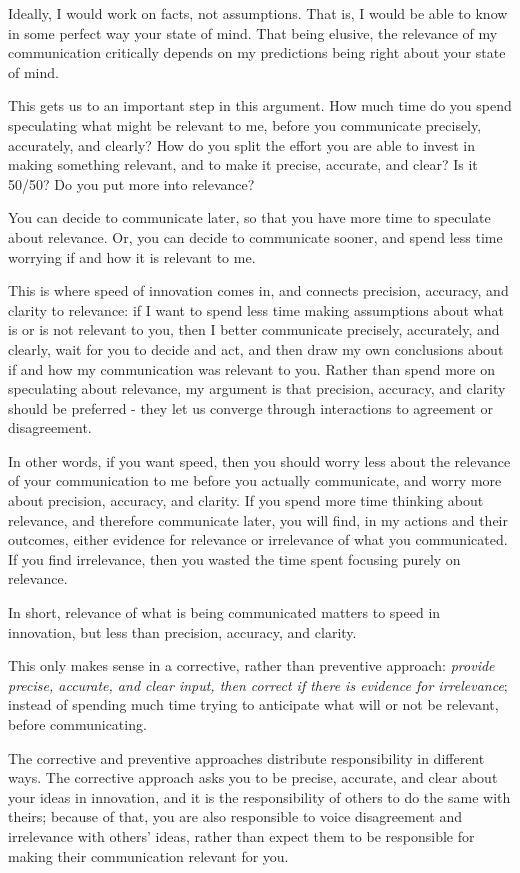 \documentclass[graybox,envcountchap,sectrefs]{svmono}
\begin{document}
Ideally, I would work on facts, not assumptions. That is, I would be able to know in some perfect way your state of mind. That being elusive, the relevance of my communication critically depends on my predictions being right about your state of mind. 

This gets us to an important step in this argument. How much time do you spend speculating what might be relevant to me, before you communicate precisely, accurately, and clearly? How do you split the effort you are able to invest in making something relevant, and to make it precise, accurate, and clear? Is it 50/50? Do you put more into relevance? 

You can decide to communicate later, so that you have more time to speculate about relevance. Or, you can decide to communicate sooner, and spend less time worrying if and how it is relevant to me. 

This is where speed of innovation comes in, and connects precision, accuracy, and clarity to relevance: if I want to spend less time making assumptions about what is or is not relevant to you, then I better communicate precisely, accurately, and clearly, wait for you to decide and act, and then draw my own conclusions about if and how my communication was relevant to you. Rather than spend more on speculating about relevance, my argument is that precision, accuracy, and clarity should be preferred - they let us converge through interactions to agreement or disagreement.

In other words, if you want speed, then you should worry less about the relevance of your communication to me before you actually communicate, and worry more about precision, accuracy, and clarity. If you spend more time thinking about relevance, and therefore communicate later, you will find, in my actions and their outcomes, either evidence for relevance or irrelevance of what you communicated. If you find irrelevance, then you wasted the time spent focusing purely on relevance.

In short, relevance of what is being communicated matters to speed in innovation, but less than precision, accuracy, and clarity. 

This only makes sense in a corrective, rather than preventive approach: \textit{provide precise, accurate, and clear input, then correct if there is evidence for irrelevance}; instead of spending much time trying to anticipate what will or not be relevant, before communicating.

The corrective and preventive approaches distribute responsibility in different ways. The corrective approach asks you to be precise, accurate, and clear about your ideas in innovation, and it is the responsibility of others to do the same with theirs; because of that, you are also responsible to voice disagreement and irrelevance with others' ideas, rather than expect them to be responsible for making their communication relevant for you.
\end{document}
